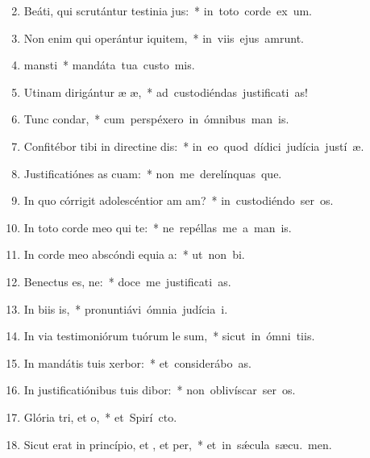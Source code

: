 \begin{flushleft}
\begin{enumerate}[leftmargin=*]
\setcounter{enumi}{1}

\item Beáti, qui scrutántur testinia jus:~* \mbox{in toto corde ex um.}
\item Non enim qui operántur iquitem,~* \mbox{in viis ejus amrunt.}
\item {} mansti~* \mbox{mandáta tua custo mis.}
\item Utinam dirigántur æ æ,~* \mbox{ad custodiéndas justificati as!}
\item Tunc  condar,~* \mbox{cum perspéxero in ómnibus man is.}
\item Confitébor tibi in directine dis:~* \mbox{in eo quod dídici judícia justí æ.}
\item Justificatiónes as cuam:~* \mbox{non me derelínquas que.}
\item In quo córrigit adolescéntior am am?~* \mbox{in custodiéndo ser os.}
\item In toto corde meo qui te:~* \mbox{ne repéllas me a man is.}
\item In corde meo abscóndi equia a:~* \mbox{ut non  bi.}
\item Benectus es, ne:~* \mbox{doce me justificati as.}
\item In biis is,~* \mbox{pronuntiávi ómnia judícia  i.}
\item In via testimoniórum tuórum le sum,~* \mbox{sicut in ómni tiis.}
\item In mandátis tuis xerbor:~* \mbox{et considerábo  as.}
\item In justificatiónibus tuis dibor:~* \mbox{non oblivíscar ser os.}
\item Glória tri, et o,~* \mbox{et Spirí cto.}
\item Sicut erat in princípio, et , et per,~* \mbox{et in s\'{\ae}cula sæcu. men.}


\end{enumerate}
\end{flushleft}
